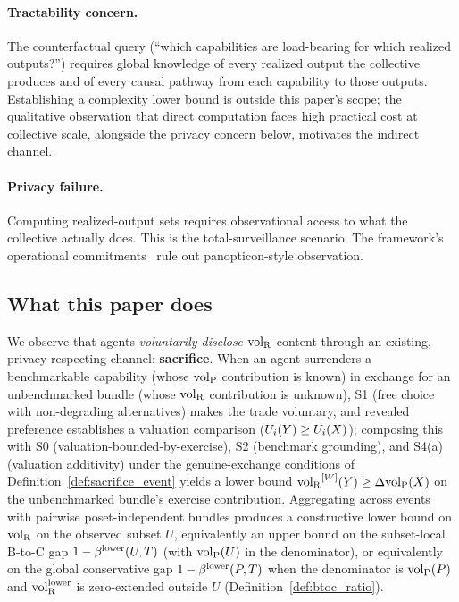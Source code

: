\paragraph{Tractability concern.}
The counterfactual query (``which capabilities are
load-bearing for which realized outputs?'') requires global
knowledge of every realized output the collective produces and
of every causal pathway from each capability to those outputs.
Establishing a complexity lower bound is outside this paper's
scope; the qualitative observation that direct computation
faces high practical cost at collective scale, alongside the
privacy concern below, motivates the indirect channel.

\paragraph{Privacy failure.}
Computing realized-output sets requires observational access to
what the collective actually does.  This is the
total-surveillance scenario.  The framework's operational
commitments~\citep{lasser2026exo,lasser2026phase,lasser2026wamura}
rule out panopticon-style observation.

\subsection{What this paper does}

We observe that agents \emph{voluntarily disclose}
${\operatorname{vol}_{\mathrm{R}}}$-content through an existing, privacy-respecting channel:
\textbf{sacrifice}.  When an agent surrenders a benchmarkable
capability (whose ${\operatorname{vol}_{\mathrm{P}}}$ contribution is known) in exchange for
an unbenchmarked bundle (whose ${\operatorname{vol}_{\mathrm{R}}}$ contribution is unknown),
S1 (free choice with non-degrading alternatives) makes the trade
voluntary, and revealed preference establishes a valuation
comparison ($U_i(Y) \geq U_i(X)$); composing this with S0
(valuation-bounded-by-exercise), S2 (benchmark grounding), and
S4(a) (valuation additivity) under the genuine-exchange
conditions of Definition~\ref{def:sacrifice_event} yields a
lower bound ${\operatorname{vol}_{\mathrm{R}}}^{[W]}(Y) \geq \Delta{\operatorname{vol}_{\mathrm{P}}}(X)$ on the
unbenchmarked bundle's exercise contribution.  Aggregating
across events with pairwise poset-independent bundles produces
a constructive lower bound on ${\operatorname{vol}_{\mathrm{R}}}$ on the observed subset
$U$, equivalently an upper bound on the subset-local B-to-C
gap $1 - \beta^{\mathrm{lower}}(U,T)$ (with ${\operatorname{vol}_{\mathrm{P}}}(U)$ in the denominator),
or equivalently on the global conservative gap
$1 - \beta^{\mathrm{lower}}(P,T)$ when the denominator is ${\operatorname{vol}_{\mathrm{P}}}(P)$ and
${\operatorname{vol}_{\mathrm{R}}^{\mathrm{lower}}}$ is zero-extended outside $U$
(Definition~\ref{def:btoc_ratio}).

